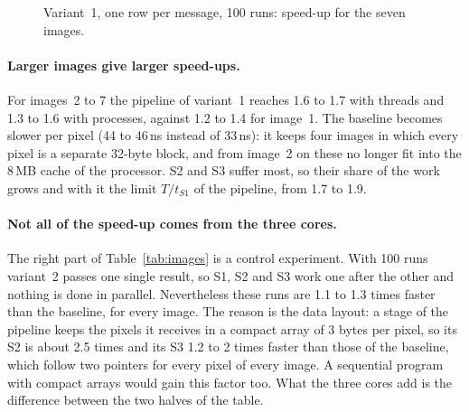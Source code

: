 \documentclass[11pt,a4paper]{article}
\begin{document}
\begin{figure}[H]
\centering
{}
\caption{Variant~1, one row per message, 100 runs: speed-up for the seven images.}
\label{fig:images}
\end{figure}

\paragraph{Larger images give larger speed-ups.} For images~2 to 7 the pipeline of variant~1
reaches 1.6 to 1.7 with threads and 1.3 to 1.6 with processes, against 1.2 to 1.4 for image~1. The
baseline becomes slower per pixel (44 to 46\,ns instead of 33\,ns): it keeps four images in which
every pixel is a separate 32-byte block, and from image~2 on these no longer fit into the 8\,MB
cache of the processor. S2 and S3 suffer most, so their share of the work grows and with it the
limit $T/t_{S1}$ of the pipeline, from 1.7 to 1.9.

\paragraph{Not all of the speed-up comes from the three cores.} The right part of
Table~\ref{tab:images} is a control experiment. With 100 runs variant~2 passes one single result,
so S1, S2 and S3 work one after the other and nothing is done in parallel. Nevertheless these runs
are 1.1 to 1.3 times faster than the baseline, for every image. The reason is the data layout: a
stage of the pipeline keeps the pixels it receives in a compact array of 3 bytes per pixel, so its
S2 is about 2.5 times and its S3 1.2 to 2 times faster than those of the baseline, which follow two
pointers for every pixel of every image. A sequential program with compact arrays would gain this factor too.
What the three cores add is the difference between the two halves of the table.
\end{document}
